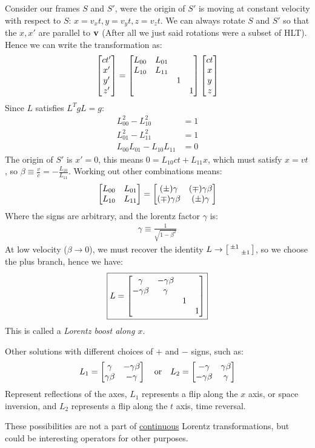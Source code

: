 Consider our frames $S$ and $S'$, were the origin of $S'$ is moving at constant velocity with respect to $S$: $x=v_xt,y=v_yt,z=v_zt$. We can always rotate $S$ and $S'$ so that the $x,x'$ are parallel to $\vb{v}$ (After all we just said rotations were a subset of HLT). Hence we can write the transformation as:
\begin{align*}
  \bmqty{ct'\\x'\\y'\\z'}=\bmqty{L_{00}&L_{01}\\L_{10}&L_{11}\\ &&1\\&&&1}
  \bmqty{ct\\x\\y\\z}
\end{align*}
Since $L$ satisfies $L^TgL=g$:
\begin{align*}
  L_{00}^2-L_{10}^2&=1\\
  L_{01}^2-L_{11}^2&=1\\
  L_{00}L_{01}-L_{10}L_{11}&=0
\end{align*}
The origin of $S'$ is $x'=0$, this means $0=L_{10}ct+L_{11}x$, which must satisfy $x=vt$, so $\beta\equiv\frac{v}{c}=-\frac{L_{10}}{L_{11}}$. Working out other combinations means:
\begin{align*}
  \bmqty{L_{00}&L_{01}\\L_{10}&L_{11}}=
  \bmqty{(\pm)\gamma&(\mp)\gamma\beta\\(\mp)\gamma\beta&(\pm)\gamma}
\end{align*}
Where the signs are arbitrary, and the lorentz factor $\gamma$ is:
\begin{align*}
  \gamma\equiv\frac1{\sqrt{1-\beta^2}}
\end{align*}
At low velocity ($\beta\to0$), we must recover the identity $L\to\smqty[\pm1\\&\pm1]$, so we choose the plus branch, hence we have:
\begin{align*}
  \boxed{L=\bmqty{\gamma&-\gamma\beta\\-\gamma\beta&\gamma\\&&1\\&&&1}}
\end{align*}
This is called a \emph{Lorentz boost along $x$}.

\begin{remark}
  Other solutions with different choices of $+$ and $-$ signs, such as:
  \begin{align*}
    L_{1}=\bmqty{\gamma&-\gamma\beta\\\gamma\beta&-\gamma}
    \quad\text{or}\quad
    L_{2}=\bmqty{-\gamma&\gamma\beta\\-\gamma\beta&\gamma}
  \end{align*}
  Represent reflections of the axes, $L_1$ represents a flip along the $x$ axis, or space inversion, and $L_2$ represents a flip along the $t$ axis, time reversal.

  These possibilities are not a part of \underline{continuous} Lorentz transformations, but could be interesting operators for other purposes.
\end{remark}

